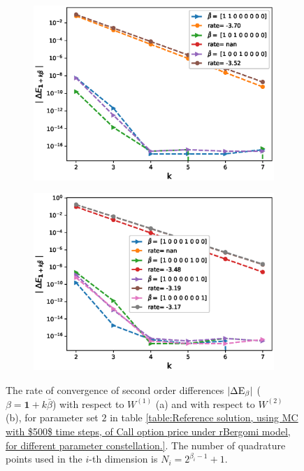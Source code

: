 \begin{figure}[h!]
	\centering
	\begin{subfigure}{.4\textwidth}
		\centering
		\includegraphics[width=1\linewidth]{./figures/rBergomi_mixed_error_rates/without_change_measure/N_4/H_002/mixed_difference_order2_rbergomi_4steps_H_002_K_1_totally_hierarch_with_rate_W1}
		\caption{}
		\label{fig:sub3}
	\end{subfigure}%
	\begin{subfigure}{.4\textwidth}
		\centering
		\includegraphics[width=1\linewidth]{./figures/rBergomi_mixed_error_rates/without_change_measure/N_4/H_002/mixed_difference_order2_rbergomi_4steps_H_002_K_1_totally_hierarch_with_rate_W2}
		\caption{}
		\label{fig:sub4}
	\end{subfigure}
	
	\caption{The rate of convergence of  second order differences $\left\lvert\Delta \text{E}_{\beta}\right\rvert$ ($\beta=\mathbf{1}+k \bar{\beta}$) with respect to $W^{(1)}$ (a)  and  with respect to $W^{(2)}$ (b), for parameter set $2$ in table \ref{table:Reference solution, using MC with $500$ time steps, of Call option price under rBergomi model, for different parameter constellation.}. The number of quadrature points used in the $i$-th dimension is $N_i=2^{\beta_i-1}+1$.}
	\label{fig:second_diff_comp_K_1_H_002}
\end{figure}

